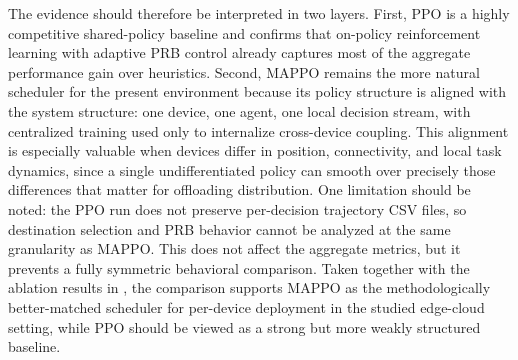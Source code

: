 The evidence should therefore be interpreted in two layers. First, PPO is a highly competitive shared-policy baseline and confirms that on-policy reinforcement learning with adaptive PRB control already captures most of the aggregate performance gain over heuristics. Second, MAPPO remains the more natural scheduler for the present environment because its policy structure is aligned with the system structure: one device, one agent, one local decision stream, with centralized training used only to internalize cross-device coupling. This alignment is especially valuable when devices differ in position, connectivity, and local task dynamics, since a single undifferentiated policy can smooth over precisely those differences that matter for offloading distribution. One limitation should be noted: the PPO run does not preserve per-decision trajectory CSV files, so destination selection and PRB behavior cannot be analyzed at the same granularity as MAPPO. This does not affect the aggregate metrics, but it prevents a fully symmetric behavioral comparison. Taken together with the ablation results in , the comparison supports MAPPO as the methodologically better-matched scheduler for per-device deployment in the studied edge-cloud setting, while PPO should be viewed as a strong but more weakly structured baseline.
